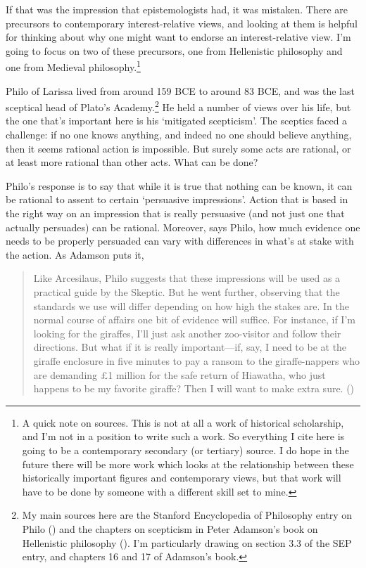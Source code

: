 \documentclass[
  10pt,
  letterpaper,
  twoside]{scrbook}
\begin{document}
If that was the impression that epistemologists had, it was mistaken.
There are precursors to contemporary interest-relative views, and
looking at them is helpful for thinking about why one might want to
endorse an interest-relative view. I'm going to focus on two of these
precursors, one from Hellenistic philosophy and one from Medieval
philosophy.\footnote{A quick note on sources. This is not at all a work
  of historical scholarship, and I'm not in a position to write such a
  work. So everything I cite here is going to be a contemporary
  secondary (or tertiary) source. I do hope in the future there will be
  more work which looks at the relationship between these historically
  important figures and contemporary views, but that work will have to
  be done by someone with a different skill set to mine.}

Philo of Larissa lived from around 159 BCE to around 83 BCE, and was the
last sceptical head of Plato's Academy.\footnote{My main sources here
  are the Stanford Encyclopedia of Philosophy entry on Philo
  () and the
  chapters on scepticism in Peter Adamson's book on Hellenistic
  philosophy (). I'm
  particularly drawing on section 3.3 of the SEP entry, and chapters 16
  and 17 of Adamson's book.} He held a number of views over his life,
but the one that's important here is his `mitigated scepticism'. The
sceptics faced a challenge: if no one knows anything, and indeed no one
should believe anything, then it seems rational action is impossible.
But surely some acts are rational, or at least more rational than other
acts. What can be done?

Philo's response is to say that while it is true that nothing can be
known, it can be rational to assent to certain `persuasive impressions'.
Action that is based in the right way on an impression that is really
persuasive (and not just one that actually persuades) can be rational.
Moreover, says Philo, how much evidence one needs to be properly
persuaded can vary with differences in what's at stake with the action.
As Adamson puts it,

\begin{quote}
Like Arcesilaus, Philo suggests that these impressions will be used as a
practical guide by the Skeptic. But he went further, observing that the
standards we use will differ depending on how high the stakes are. In
the normal course of affairs one bit of evidence will suffice. For
instance, if I'm looking for the giraffes, I'll just ask another
zoo-visitor and follow their directions. But what if it is really
important---if, say, I need to be at the giraffe enclosure in five
minutes to pay a ransom to the giraffe-nappers who are demanding £1
million for the safe return of Hiawatha, who just happens to be my
favorite giraffe? Then I will want to make extra sure.
()
\end{quote}
\end{document}
